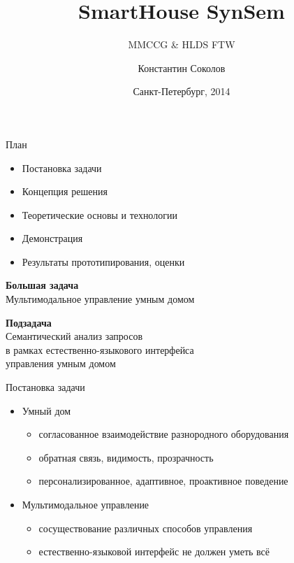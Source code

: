 \documentclass{beamer}
\begin{document}
\title{\huge{SmartHouse SynSem}}
\subtitle{MMCCG \& HLDS FTW}
\author{Константин Соколов}
\date{Санкт-Петербург, 2014} 
\begin{frame}
    \thispagestyle{empty}
    \titlepage
\end{frame}

\begin{frame}{План}
    \setcounter{framenumber}{1}
    \begin{itemize}
        \item Постановка задачи
        \item Концепция решения
        \item Теоретические основы и технологии
        \item Демонстрация
        \item Результаты прототипирования, оценки
    \end{itemize}
\end{frame}


\begin{frame}{}
\begin{center}
\textbf{Большая задача}\\
\bigskip
Мультимодальное управление умным домом
\end{center}
\bigskip
\begin{center}
\textbf{Подзадача}\\
\bigskip
Семантический анализ запросов \\в рамках естественно-языкового интерфейса \\управления умным домом
\end{center}
\end{frame}

\begin{frame}{Постановка задачи}
\begin{itemize}
  \item Умный дом
	\begin{itemize}
  		\item согласованное взаимодействие разнородного оборудования
		\item обратная связь, видимость, прозрачность
		\item персонализированное, адаптивное, проактивное поведение
	\end{itemize}
  \bigskip
  \item Мультимодальное управление
	\begin{itemize}
  		\item сосуществование различных способов управления
		\item естественно-языковой интерфейс не должен уметь всё
	\end{itemize}
\end{itemize}
\end{frame}
\end{document}
